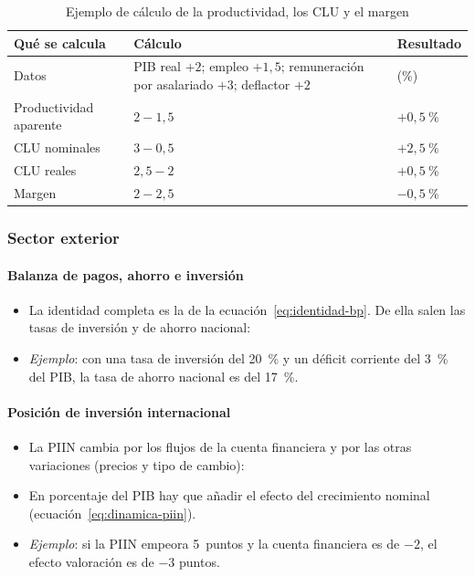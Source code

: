 \documentclass[11pt]{article}
\begin{document}
\begin{table}[H]
\centering\small
\caption{Ejemplo de cálculo de la productividad, los CLU y el margen}\label{tab:ejemplo-clu}
\begin{tabular}{>{\raggedright\arraybackslash}p{4.3cm}>{\centering\arraybackslash}p{5.3cm}>{\centering\arraybackslash}p{2.4cm}}
\toprule
\rowcolor{tceeazulpalido}
\textbf{Qué se calcula} & \textbf{Cálculo} & \textbf{Resultado} \\
\midrule
Datos & PIB real $+2$; empleo $+1{,}5$; remuneración por asalariado $+3$; deflactor $+2$ & (\%) \\
Productividad aparente & $2-1{,}5$ & $+0{,}5~\%$ \\
CLU nominales & $3-0{,}5$ & $+2{,}5~\%$ \\
CLU reales & $2{,}5-2$ & $+0{,}5~\%$ \\
\rowcolor{tceesalvia}
Margen & $2-2{,}5$ & $-0{,}5~\%$ \\
\bottomrule
\end{tabular}
\end{table}

\subsubsection{Sector exterior}\label{anexo:calc-exterior}

\paragraph{Balanza de pagos, ahorro e inversión}
\begin{itemize}
\item La identidad completa es la de la ecuación~\eqref{eq:identidad-bp}. De ella salen las tasas de inversión y de ahorro nacional:
\item \emph{Ejemplo}: con una tasa de inversión del 20~\% y un déficit corriente del 3~\% del PIB, la tasa de ahorro nacional es del 17~\%.
\end{itemize}

\paragraph{Posición de inversión internacional}
\begin{itemize}
\item La PIIN cambia por los flujos de la cuenta financiera y por las otras variaciones (precios y tipo de cambio):
\item En porcentaje del PIB hay que añadir el efecto del crecimiento nominal (ecuación~\eqref{eq:dinamica-piin}).
\item \emph{Ejemplo}: si la PIIN empeora 5~puntos y la cuenta financiera es de $-2$, el efecto valoración es de $-3$ puntos.
\end{itemize}
\end{document}
